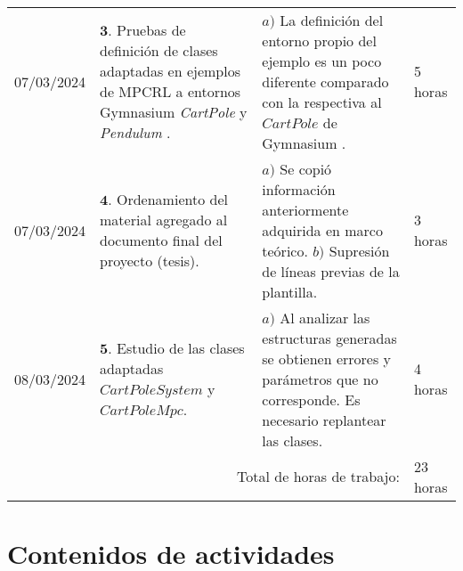 \documentclass[12pt]{article}
\begin{document}
\hfill\\
\begin{minipage}[h]{\textwidth}
	\centering
	\begin{tabularx}{\textwidth}{|p{2cm}|X|X|p{2cm}|} 
		\hline		
		
	 	07/03/2024 & 
	 	$\mathbf{3}.$ Pruebas de definición de clases adaptadas en ejemplos de MPCRL a entornos Gymnasium \textit{CartPole} y \textit{Pendulum} \cite{gym}. & 
	 	$a)$ La definición del entorno propio del ejemplo es un poco diferente comparado con la respectiva al $CartPole$ de Gymnasium \cite{gym}.  \newline & 
	 	5 horas \\
	 	07/03/2024 & 
	 	$\mathbf{4}.$ Ordenamiento del material agregado al documento final del proyecto (tesis). &
	 	$a)$ Se copió información anteriormente adquirida en marco teórico. \newline
	 	$b)$ Supresión de líneas previas de la plantilla. \newline & 
	 	3 horas \\
	 	08/03/2024 & 
	 	$\mathbf{5}.$ Estudio de las clases adaptadas $CartPoleSystem$ y $CartPoleMpc$. &
	 	$a)$ Al analizar las estructuras generadas se obtienen errores y parámetros que no corresponde. Es necesario replantear las clases. \newline & 
	 	4 horas \\
	 	
	 	\hline
		\multicolumn{3}{|r|}{Total de horas de trabajo:} & 23 horas \\ 
	 	\hline                 
	\end{tabularx}
\end{minipage}




\section*{Contenidos de actividades}
\end{document}
